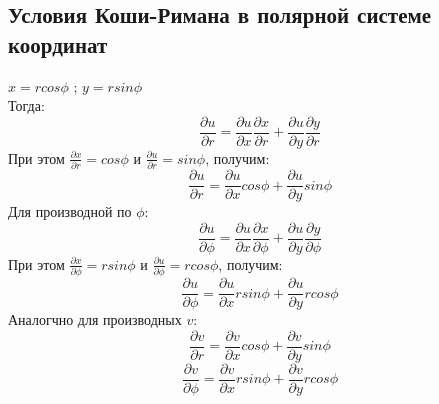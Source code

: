 \documentclass{article}
\begin{document}
            \subsection{Условия Коши-Римана в полярной системе координат}
            $x=r cos \phi $ ; $y= r sin \phi$\\
          Тогда:
          \begin{equation}
            \frac{\partial u}{\partial r}=\frac{\partial u}{\partial x} \frac{\partial x}{\partial r} + \frac{\partial u}{\partial y} \frac{\partial y}{\partial r}  
          \end{equation}
          При этом $\frac{\partial x}{\partial r}=cos \phi$ и $\frac{\partial u}{\partial r}=sin \phi$, получим:
          \begin{equation}
            \frac{\partial u}{\partial r}=\frac{\partial u}{\partial x} cos \phi + \frac{\partial u}{\partial y} sin \phi  
          \end{equation}
          Для производной по $\phi$:
          \begin{equation}
            \frac{\partial u}{\partial \phi}=\frac{\partial u}{\partial x} \frac{\partial x}{\partial \phi} + \frac{\partial u}{\partial y} \frac{\partial y}{\partial \phi}  
          \end{equation}
          При этом $\frac{\partial x}{\partial \phi}=r sin \phi$ и $\frac{\partial u}{\partial \phi}=r cos \phi$, получим:
          \begin{equation}
            \frac{\partial u}{\partial \phi}=\frac{\partial u}{\partial x} r sin \phi + \frac{\partial u}{\partial y} r cos \phi  
          \end{equation}
        Аналогчно для производных $v$:
          \begin{equation}
            \frac{\partial v}{\partial r}=\frac{\partial v}{\partial x} cos \phi + \frac{\partial v}{\partial y} sin \phi  
          \end{equation}
          \begin{equation}
            \frac{\partial v}{\partial \phi}=\frac{\partial v}{\partial x} r sin \phi + \frac{\partial v}{\partial y} r cos \phi  
          \end{equation}
\end{document}
